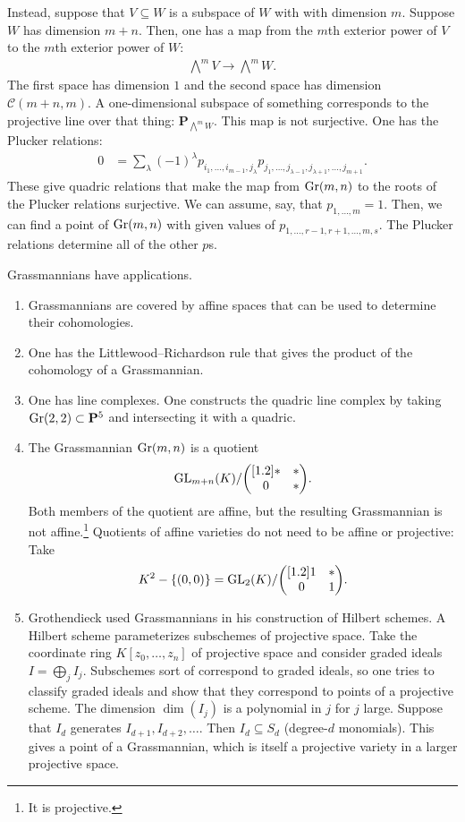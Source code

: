 \documentclass [11 pt, oneside] {article}
\begin{document}
Instead, suppose that $V\subseteq W$ is a subspace of $W$ with with dimension $m$. Suppose $W$ has dimension $m+n$. Then, one has a map from the $m$th exterior power of $V$ to the $m$th exterior power of $W$:
\begin{align*}
	\bigwedge\nolimits^m V \longrightarrow  \bigwedge\nolimits ^m W.
\end{align*}
The first space has dimension $1$ and the second space has dimension $\mathscr{C}({m+n},{m})$. A one-dimensional subspace of something corresponds to the projective line over that thing: $\mathbf{P}_{\bigwedge\nolimits^m W}$. This map is not surjective. 
One has the Plucker relations:
\begin{align*}
	0 &= \sum_{\lambda}^{} (-1)^\lambda p_{i_1,\hdots, i_{m-1},j_\lambda} p_{j_1,\hdots, j_{\lambda -1},j_{\lambda+1},\hdots, j_{m+1}}.
\end{align*}
These give quadric relations that make the map from $\operatorname{Gr}(m,n)$ to the roots of the Plucker relations surjective. We can assume, say, that $p_{1,\hdots, m} = 1$. Then, we can find a point of $\operatorname{Gr}(m,n)$ with given values of $p_{1,\hdots, r-1,r+1,\hdots, m,s}$. The Plucker relations determine all of the other $p$s.

Grassmannians have applications.
\begin{enumerate}
	\item Grassmannians are covered by affine spaces that can be used to determine their cohomologies.
	\item One has the Littlewood--Richardson rule that gives the product of the cohomology of a Grassmannian.
	\item One has line complexes. One constructs the quadric line complex by taking $\operatorname{Gr}(2,2)\subset  \mathbf{P}^5$ and intersecting it with a quadric.
	\item The Grassmannian $\operatorname{Gr}(m,n)$ is a quotient 
		\[
			{\operatorname{GL}_{m+n}(K)}/{\begin{pmatrix} [1.2] *&*\\0&*\end{pmatrix}}.
		\] 
		Both members of the quotient are affine, but the resulting Grassmannian is not affine.\footnote{It is projective.} Quotients of affine varieties do not need to be affine or projective: Take 
		\begin{align*}
			K^2 - \{(0,0)\} =  {\operatorname{GL}_{2}(K) }/{\begin{pmatrix} [1.2] 1&*\\0&1\end{pmatrix}}.
		\end{align*}
	\item Grothendieck used Grassmannians in his construction of Hilbert schemes. A Hilbert scheme parameterizes subschemes of projective space. Take the coordinate ring $K[z_0,\hdots, z_n]$ of projective space and consider graded ideals $I = \bigoplus_j I_j$. Subschemes sort of correspond to graded ideals, so one tries to classify graded ideals and show that they correspond to points of a projective scheme. The dimension $\dim (I_j)$ is a polynomial in $j$ for $j$ large. Suppose that $I_d$ generates $I_{d+1},I_{d+2},\hdots$. Then $I_d \subseteq S_d$ (degree-$d$ monomials). This gives a point of a Grassmannian, which is itself a projective variety in a larger projective space.
\end{enumerate}
\end{document}

